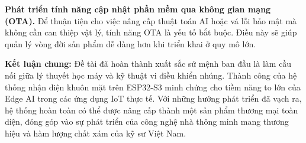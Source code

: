 \textbf{Phát triển tính năng cập nhật phần mềm qua không gian mạng (OTA).} Để thuận tiện cho việc nâng cấp thuật toán AI hoặc vá lỗi bảo mật mà không cần can thiệp vật lý, tính năng OTA là yếu tố bắt buộc. Điều này sẽ giúp quản lý vòng đời sản phẩm dễ dàng hơn khi triển khai ở quy mô lớn.

\vspace{1em}
\noindent\textbf{Kết luận chung:} Đề tài đã hoàn thành xuất sắc sứ mệnh ban đầu là làm cầu nối giữa lý thuyết học máy và kỹ thuật vi điều khiển nhúng. Thành công của hệ thống nhận diện khuôn mặt trên ESP32-S3 minh chứng cho tiềm năng to lớn của Edge AI trong các ứng dụng IoT thực tế. Với những hướng phát triển đã vạch ra, hệ thống hoàn toàn có thể được nâng cấp thành một sản phẩm thương mại toàn diện, đóng góp vào sự phát triển của công nghệ nhà thông minh mang thương hiệu và hàm lượng chất xám của kỹ sư Việt Nam.